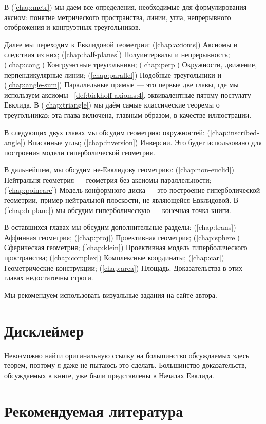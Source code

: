 В (\ref{chap:metr}) мы даем все определения, необходимые для формулирования аксиом:
понятие метрического пространства, 
линии, 
угла, 
непрерывного отоброжения и конгруэтных треугольников.


Далее мы переходим к Евклидовой геометрии:
(\ref{chap:axioms}) Аксиомы и следствия из них;
(\ref{chap:half-planes}) Полуинтервалы и непрерывность;
(\ref{chap:cong}) Конгруэнтные треугольники;
(\ref{chap:perp}) Окружности, движение, перпендикулярные линии;
(\ref{chap:parallel}) Подобные треугольники и (\ref{chap:angle-sum}) Параллельные прямые  
--- это первые две главы, где мы используем аксиомы ~\ref{def:birkhoff-axioms:4}, эквивалентные пятому постулату Евклида.
В (\ref{chap:triangle}) мы даём самые классические теоремы о треугольниказ;
эта глава включена, главным образом, в качестве иллюстрации.


В следующих двух главах мы обсудим геометрию окружностей:
(\ref{chap:inscribed-angle}) Вписанные углы; (\ref{chap:inversion}) Инверсии.
Это будет использовано для построения модели гиперболической геометрии.

В дальнейшем, 
мы обсудим не-Евклидову геометрию:
(\ref{chap:non-euclid})
Нейтральня геометрия --- геометрия без аксиомы параллельности;
(\ref{chap:poincare})
Модель конформного диска ---
это построение гиперболической геометрии,
пример нейтральной плоскости, не являющейся Евклидовой.
В (\ref{chap:h-plane}) мы обсудим гиперболическую --- конечная точка книги.

В оставшихся главах мы обсудим дополнительные разделы:
(\ref{chap:trans}) Аффинная геометрия;
(\ref{chap:proj}) Проективная геометрия;
(\ref{chap:sphere}) Сферическая геометрия;
(\ref{chap:klein}) Проективная модель гиперболического пространства;
(\ref{chap:complex}) Комплексные координаты;
(\ref{chap:car}) Геометрические конструкции;
(\ref{chap:area}) Площадь.
Доказательства в этих главах недостаточны строги.

Мы рекомендуем использовать визуальные задания на сайте автора.

\section*{Дисклеймер}

Невозможно найти оригинальную ссылку на большинство обсуждаемых здесь теорем, поэтому я даже не пытаюсь это сделать.
Большинство доказательств, обсуждаемых в книге,
уже были представлены в Началах Евклида.

\section*{Рекомендуемая литература}

